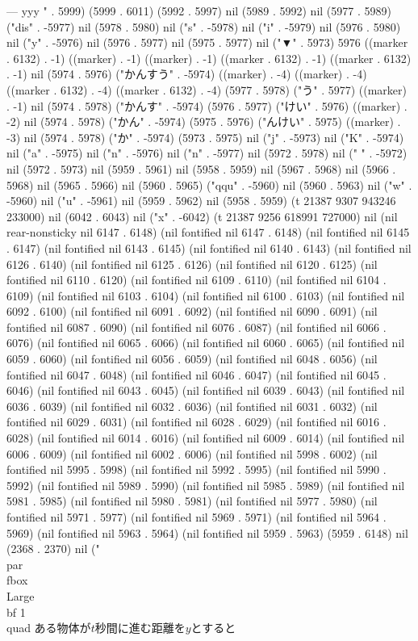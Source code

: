 ---
yyy
" . 5999) (5999 . 6011) (5992 . 5997) nil (5989 . 5992) nil (5977 . 5989) ("dis" . -5977) nil (5978 . 5980) nil ("s" . -5978) nil ("i" . -5979) nil (5976 . 5980) nil ("y" . -5976) nil (5976 . 5977) nil (5975 . 5977) nil ("▼" . 5973) 5976 ((marker . 6132) . -1) ((marker) . -1) ((marker) . -1) ((marker . 6132) . -1) ((marker . 6132) . -1) nil (5974 . 5976) ("かんすう" . -5974) ((marker) . -4) ((marker) . -4) ((marker . 6132) . -4) ((marker . 6132) . -4) (5977 . 5978) ("う" . 5977) ((marker) . -1) nil (5974 . 5978) ("かんす" . -5974) (5976 . 5977) ("けい" . 5976) ((marker) . -2) nil (5974 . 5978) ("かん" . -5974) (5975 . 5976) ("んけい" . 5975) ((marker) . -3) nil (5974 . 5978) ("か" . -5974) (5973 . 5975) nil ("j" . -5973) nil ("K" . -5974) nil ("a" . -5975) nil ("n" . -5976) nil ("n" . -5977) nil (5972 . 5978) nil (" " . -5972) nil (5972 . 5973) nil (5959 . 5961) nil (5958 . 5959) nil (5967 . 5968) nil (5966 . 5968) nil (5965 . 5966) nil (5960 . 5965) ("qqu" . -5960) nil (5960 . 5963) nil ("w" . -5960) nil ("u" . -5961) nil (5959 . 5962) nil (5958 . 5959) (t 21387 9307 943246 233000) nil (6042 . 6043) nil ("x" . -6042) (t 21387 9256 618991 727000) nil (nil rear-nonsticky nil 6147 . 6148) (nil fontified nil 6147 . 6148) (nil fontified nil 6145 . 6147) (nil fontified nil 6143 . 6145) (nil fontified nil 6140 . 6143) (nil fontified nil 6126 . 6140) (nil fontified nil 6125 . 6126) (nil fontified nil 6120 . 6125) (nil fontified nil 6110 . 6120) (nil fontified nil 6109 . 6110) (nil fontified nil 6104 . 6109) (nil fontified nil 6103 . 6104) (nil fontified nil 6100 . 6103) (nil fontified nil 6092 . 6100) (nil fontified nil 6091 . 6092) (nil fontified nil 6090 . 6091) (nil fontified nil 6087 . 6090) (nil fontified nil 6076 . 6087) (nil fontified nil 6066 . 6076) (nil fontified nil 6065 . 6066) (nil fontified nil 6060 . 6065) (nil fontified nil 6059 . 6060) (nil fontified nil 6056 . 6059) (nil fontified nil 6048 . 6056) (nil fontified nil 6047 . 6048) (nil fontified nil 6046 . 6047) (nil fontified nil 6045 . 6046) (nil fontified nil 6043 . 6045) (nil fontified nil 6039 . 6043) (nil fontified nil 6036 . 6039) (nil fontified nil 6032 . 6036) (nil fontified nil 6031 . 6032) (nil fontified nil 6029 . 6031) (nil fontified nil 6028 . 6029) (nil fontified nil 6016 . 6028) (nil fontified nil 6014 . 6016) (nil fontified nil 6009 . 6014) (nil fontified nil 6006 . 6009) (nil fontified nil 6002 . 6006) (nil fontified nil 5998 . 6002) (nil fontified nil 5995 . 5998) (nil fontified nil 5992 . 5995) (nil fontified nil 5990 . 5992) (nil fontified nil 5989 . 5990) (nil fontified nil 5985 . 5989) (nil fontified nil 5981 . 5985) (nil fontified nil 5980 . 5981) (nil fontified nil 5977 . 5980) (nil fontified nil 5971 . 5977) (nil fontified nil 5969 . 5971) (nil fontified nil 5964 . 5969) (nil fontified nil 5963 . 5964) (nil fontified nil 5959 . 5963) (5959 . 6148) nil (2368 . 2370) nil ("\\par \\fbox{{\\Large\\bf 1}}\\quad ある物体が$t$秒間に進む距離を$y$とすると
